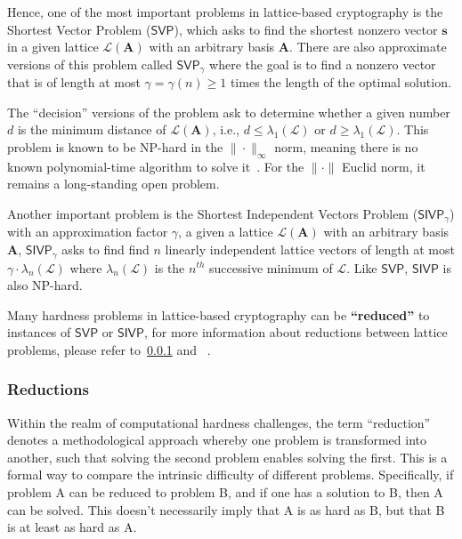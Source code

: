 \documentclass[cryptography,review,submit,pdftex,moreauthors,amsmath,amssymb,aps,strict]{Definitions/mdpi}
\newcommand{\peter}[1]{\textcolor{red}{#1}}
\begin{document}
Hence, one of the most important problems in lattice-based cryptography is the Shortest Vector Problem ($\mathsf{SVP}$), which asks to find the shortest nonzero vector $\mathbf{s}$ in a given lattice $\mathcal{L}(\mathbf{A})$ with an arbitrary basis $\mathbf{A}$. There are also approximate versions of this problem called $\mathsf{SVP}_{\gamma}$ where the goal is to find a nonzero vector that is of length at most $\gamma = \gamma(n)\geq 1$ times the length of the optimal solution.

The ``decision'' versions of the problem ask to determine whether a given number $d$ is the minimum distance of $\mathcal{L}(\mathbf{A})$, i.e., $d \leq \lambda_1(\mathcal{L})$ or $d \geq \lambda_1(\mathcal{L})$.
This problem is known to be NP-hard in the $\|\cdot\|_{\infty}$ norm, meaning there is no known polynomial-time algorithm to solve it~\cite{hardness_of_SVP}. For the $\|\cdot\|$ Euclid norm, it remains a long-standing open problem. 

Another important problem is the Shortest Independent Vectors Problem ($\mathsf{SIVP}_{\gamma}$) with an approximation factor $\gamma$, a given a lattice $\mathcal{L}(\mathbf{A})$ with an arbitrary basis $\mathbf{A}$, $\mathsf{SIVP}_{\gamma}$ asks to find find $n$ linearly independent lattice vectors of length at most $\gamma\cdot \lambda_{n}(\mathcal{L})$ where $\lambda_{n}(\mathcal{L})$ is the $n^{th}$ successive minimum of $\mathcal{L}$. Like $\mathsf{SVP}$, $\mathsf{SIVP}$ is also NP-hard.

\noindent Many hardness problems in lattice-based cryptography can be \textbf{``reduced''} to instances of $\mathsf{SVP}$ or $\mathsf{SIVP}$, for more information about reductions between lattice problems, please refer to~\ref{reduction} and ~\cite{reduction_lattice}.


\subsubsection{Reductions}\label{reduction}

Within the realm of computational hardness challenges, the term ``reduction'' denotes a methodological approach whereby one problem is transformed into another, such that solving the second problem enables solving the first. This is a formal way to compare the intrinsic difficulty of different problems.  Specifically, if problem A can be reduced to problem B, and if one has a solution to B, then A can be solved. This doesn't necessarily imply that A is as hard as B, but that B is at least as hard as A. 
\end{document}
